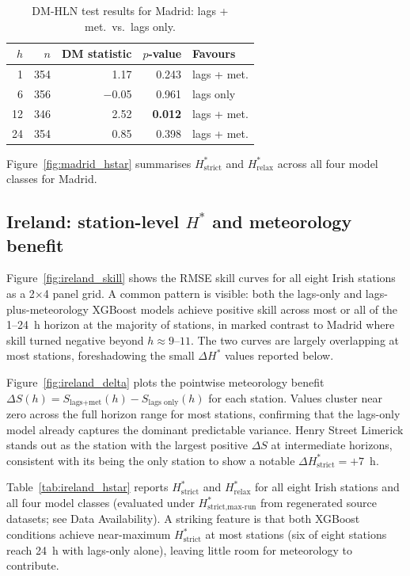 \documentclass[12pt,a4paper]{article}
\begin{document}
\begin{table}[htbp]
\centering
\caption{DM-HLN test results for Madrid: lags + met.\ vs.\ lags only.}
\label{tab:madrid_dm}
\begin{tabular}{rrrrl}
\toprule
$h$ & $n$ & DM statistic & $p$-value & Favours \\
\midrule
 1 & 354 &  1.17 & 0.243 & lags + met. \\
 6 & 356 & $-$0.05 & 0.961 & lags only \\
12 & 346 &  2.52 & \textbf{0.012} & lags + met. \\
24 & 354 &  0.85 & 0.398 & lags + met. \\
\bottomrule
\end{tabular}
\end{table}

Figure~\ref{fig:madrid_hstar} summarises $H^*_{\text{strict}}$ and
$H^*_{\text{relax}}$ across all four model classes for Madrid.

\subsection{Ireland: station-level $H^*$ and meteorology benefit}

Figure~\ref{fig:ireland_skill} shows the RMSE skill curves for all eight Irish
stations as a 2$\times$4 panel grid.  A common pattern is visible: both the
lags-only and lags-plus-meteorology XGBoost models achieve positive skill across
most or all of the 1--24~h horizon at the majority of stations, in marked
contrast to Madrid where skill turned negative beyond $h \approx 9$--$11$.
The two curves are largely overlapping at most stations, foreshadowing the small
$\Delta H^*$ values reported below.

Figure~\ref{fig:ireland_delta} plots the pointwise meteorology benefit
$\Delta S(h) = S_{\text{lags+met}}(h) - S_{\text{lags only}}(h)$ for each
station.  Values cluster near zero across the full horizon range for most
stations, confirming that the lags-only model already captures the dominant
predictable variance.  Henry Street Limerick stands out as the station with
the largest positive $\Delta S$ at intermediate horizons, consistent with its
being the only station to show a notable $\Delta H^*_{\text{strict}} = +7$~h.

Table~\ref{tab:ireland_hstar} reports $H^*_{\text{strict}}$ and
$H^*_{\text{relax}}$ for all eight Irish stations and all four model classes
(evaluated under $H^*_{\text{strict,max-run}}$ from regenerated source datasets;
see Data Availability).
A striking feature is that both XGBoost conditions achieve near-maximum
$H^*_{\text{strict}}$ at most stations (six of eight stations reach 24~h with
lags-only alone), leaving little room for meteorology to contribute.
\end{document}
